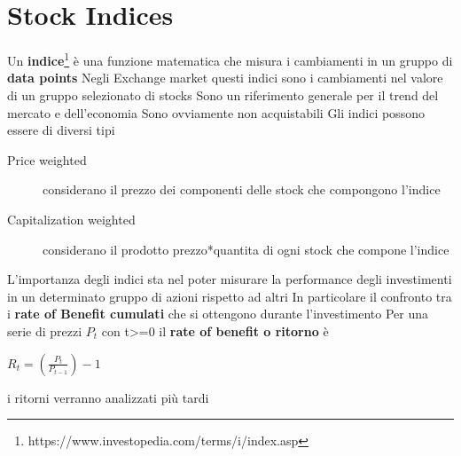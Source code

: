 \documentclass[a4paper,11pt]{report}
\begin{document}
{\section{Stock Indices} \label{Indici:1}
Un \textbf{indice}\footnote{https://www.investopedia.com/terms/i/index.asp} è una funzione matematica che misura i cambiamenti in un gruppo di \textbf{data points} \newline
Negli Exchange market questi indici sono i cambiamenti nel valore di un gruppo selezionato di stocks \newline
Sono un riferimento generale per il trend del mercato e dell'economia \newline
Sono ovviamente non acquistabili \newline
Gli indici possono essere di diversi tipi
\begin{description}
	\item[Price weighted] considerano il prezzo dei componenti delle stock che compongono l'indice
	\item[Capitalization weighted] considerano il prodotto prezzo*quantita di ogni stock che compone l'indice
\end{description}
L'importanza degli indici sta nel poter misurare la performance degli investimenti in un determinato gruppo di azioni rispetto ad altri \newline
In particolare il confronto tra i\textbf{ rate of Benefit cumulati} che si ottengono durante l'investimento \newline
Per una serie di prezzi $P_t$ con t>=0 il \textbf{ rate of benefit o ritorno} è \newline
\begin{center}
	$R_t=({\frac{P_t}{P_{t-1}}})-1$
\end{center}
i ritorni verranno analizzati più tardi %
\newpage
}
\end{document}
